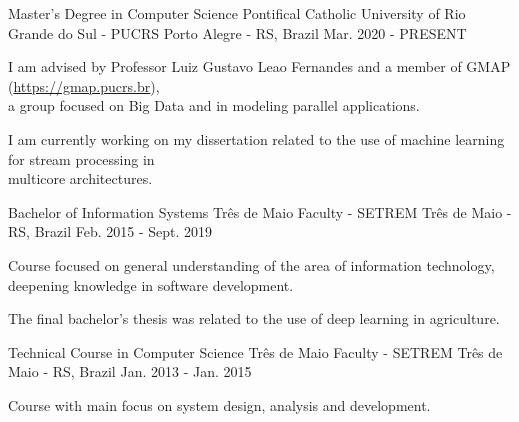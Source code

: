 
\begin{cventries}
	\cventry
	{Master's Degree in Computer Science} %
	{Pontifical Catholic University of Rio Grande do Sul - PUCRS} %
	{Porto Alegre - RS, Brazil} %
	{Mar. 2020 - PRESENT} %
	{
		\begin{cvitems} %
			\item {I am advised by Professor Luiz Gustavo Leao Fernandes and a member of GMAP (\href{https://gmap.pucrs.br}{https://gmap.pucrs.br}),\\a group focused on Big Data and in modeling parallel applications.}
			\item {I am currently working on my dissertation related to the use of machine learning for stream processing in\\multicore architectures.}
		\end{cvitems}
	}

	\cventry
	{Bachelor of Information Systems} %
	{Três de Maio Faculty - SETREM} %
	{Três de Maio - RS, Brazil} %
	{Feb. 2015 - Sept. 2019} %
	{
		\begin{cvitems} %
			\item {Course focused on general understanding of the area of information technology,\\deepening knowledge in software development.}
			\item {The final bachelor's thesis was related to the use of deep learning in agriculture.}
		\end{cvitems}
	}

	\cventry
	{Technical Course in Computer Science} %
	{Três de Maio Faculty - SETREM} %
	{Três de Maio - RS, Brazil} %
	{Jan. 2013 - Jan. 2015} %
	{
		\begin{cvitems} %
			\item {Course with main focus on system design, analysis and development.}
		\end{cvitems}
	}
\end{cventries}
